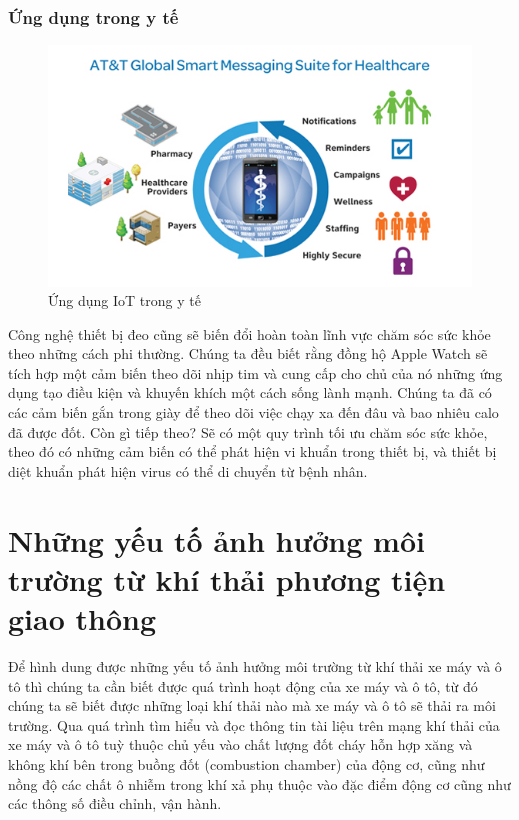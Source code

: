 \subsubsection*{Ứng dụng trong y tế}
\begin{figure}[H] 
\centering    
\includegraphics[width=1\textwidth]{pic11}
\caption[Ứng dụng IoT trong y tế ]{Ứng dụng IoT trong y tế}
\label{fig:pic11}
\end{figure}
Công nghệ thiết bị đeo cũng sẽ biến đổi hoàn toàn lĩnh vực chăm sóc sức khỏe theo những cách phi thường. Chúng ta đều biết rằng đồng hộ Apple Watch sẽ tích hợp một cảm biến theo dõi nhịp tim và cung cấp cho chủ của nó những ứng dụng tạo điều kiện và khuyến khích một cách sống lành mạnh. Chúng ta đã có các cảm biến gắn trong giày để theo dõi việc chạy xa đến đâu và bao nhiêu calo đã được đốt. Còn gì tiếp theo? Sẽ có một quy trình tối ưu chăm sóc sức khỏe, theo đó có những cảm biến có thể phát hiện vi khuẩn trong thiết bị, và thiết bị diệt khuẩn phát hiện virus có thể di chuyển từ bệnh nhân.




\section{Những yếu tố ảnh hưởng môi trường từ khí thải phương tiện giao thông}\label{sec:yeuto_khithai}
Để hình dung được những yếu tố ảnh hưởng môi trường từ khí thải xe máy và ô tô thì chúng ta cần biết được quá trình hoạt động của xe máy và ô tô, từ đó chúng ta sẽ biết được những loại khí thải nào mà xe máy và ô tô sẽ thải ra môi trường. Qua quá trình tìm hiểu và đọc thông tin tài liệu trên mạng khí thải của xe máy và ô tô tuỳ thuộc chủ yếu vào chất lượng đốt cháy hỗn hợp xăng và không khí bên trong buồng đốt (combustion chamber) của động cơ, cũng như nồng độ các chất ô nhiễm trong khí xả phụ thuộc vào đặc điểm động cơ cũng như các thông số điều chỉnh, vận hành.

